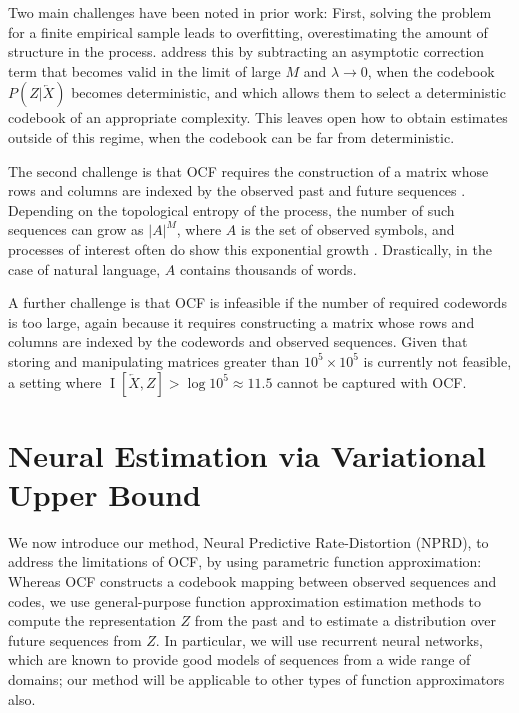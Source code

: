 \documentclass[entropy,article,submit,moreauthors,pdftex,10pt,a4paper]{Definitions/mdpi}
\newcommand{\past}{\overleftarrow{X}}
\begin{document}
Two main challenges have been noted in prior work:
First, solving the problem for a finite empirical sample leads to overfitting, overestimating the amount of structure in the process.
\citet{still-optimal-2010} address this by subtracting an asymptotic correction term that becomes valid in the limit of large $M$ and $\lambda \rightarrow 0$, when the codebook $P(Z|\past)$ becomes deterministic, and which allows them to select a deterministic codebook of an appropriate complexity.
This leaves open how to obtain estimates outside of this regime, when the codebook can be far from deterministic.

The second challenge is that OCF requires the construction of a matrix whose rows and columns are indexed by the observed past and future sequences \citep{marzen-predictive-2016}.
Depending on the topological entropy of the process, the number of such sequences can grow as $|A|^M$, where $A$ is the set of observed symbols, and processes of interest often do show this exponential growth \citep{marzen-predictive-2016}.
Drastically, in the case of natural language, $A$ contains thousands of words.

A further challenge is that OCF is infeasible if the number of required codewords is too large, again because it requires constructing a matrix whose rows and columns are indexed by the codewords and observed sequences.
Given that storing and manipulating matrices greater than $10^5 \times 10^5$ is currently not feasible, a setting where $\operatorname{I}[\past, Z] > \log 10^5 \approx 11.5$ cannot be captured with OCF.

\section{Neural Estimation via Variational Upper Bound}\label{sec:nprd}

We now introduce our method, Neural Predictive Rate-Distortion (NPRD), to address the limitations of OCF, by using parametric function approximation:
Whereas OCF constructs a codebook mapping between observed sequences and codes, we use general-purpose function approximation estimation methods to compute the representation $Z$ from the past and to estimate a distribution over future sequences from $Z$.
In particular, we will use recurrent neural networks, which are known to provide good models of sequences from a wide range of domains; our method will be applicable to other types of function approximators also.
\end{document}
